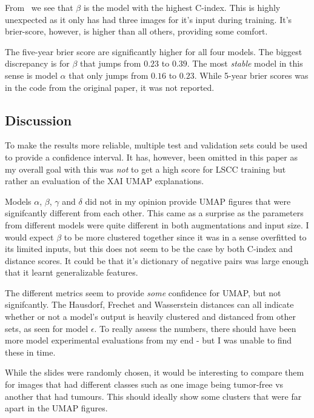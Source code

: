 \documentclass[10pt,twocolumn,letterpaper]{article}
\begin{document}
From~ we see that $\beta$ is the model with the highest C-index. This is highly unexpected as it only has had three images for it's input during training. It's brier-score, however, is higher than all others, providing some comfort. 

The five-year brier score are significantly higher for all four models. The biggest discrepancy is for $\beta$ that jumps from $0.23$ to $0.39$. The most \textit{stable} model in this sense is model $\alpha$ that only jumps from $0.16$ to $0.23$. While 5-year brier scores was in the code from the original paper, it was not reported.

\subsection{Discussion}\label{sec:discussion}
To make the results more reliable, multiple test and validation sets could be used to provide a confidence interval. It has, however, been omitted in this paper as my overall goal with this was \textit{not} to get a high score for \gls{LSCC} training but rather an evaluation of the \gls{XAI} \gls{UMAP} explanations.

Models $\alpha$, $\beta$, $\gamma$ and $\delta$ did not in my opinion provide \gls{UMAP} figures that were signifcantly different from each other. This came as a surprise as the parameters from different models were quite different in both augmentations and input size. I would expect $\beta$ to be more clustered together since it was in a sense overfitted to its limited inputs, but this does not seem to be the case by both C-index and distance scores. It could be that it's dictionary of negative pairs was large enough that it learnt generalizable features.

The different metrics seem to provide \textit{some} confidence for \gls{UMAP}, but not signifcantly. The Hausdorf, Frechet and Wasserstein distances can all indicate whether or not a model's output is heavily clustered and distanced from other sets, as seen for model $\epsilon$. To really assess the numbers, there should have been more model experimental evaluations from my end - but I was unable to find these in time.

While the slides were randomly chosen, it would be interesting to compare them for images that had different classes such as one image being tumor-free vs another that had tumours. This should ideally show some clusters that were far apart in the \gls{UMAP} figures.
\end{document}
